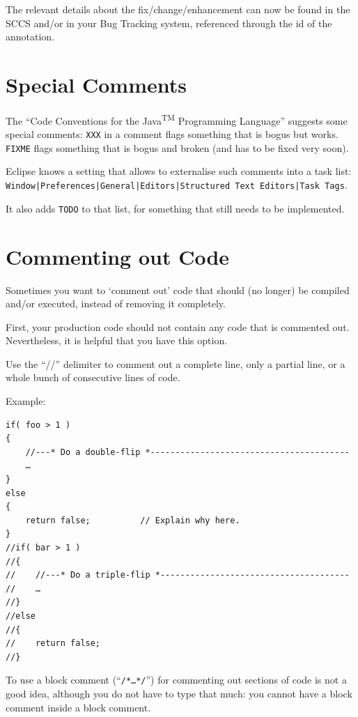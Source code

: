 \documentclass[11pt,a4paper, titlepage, parskip=half, headsepline, footsepline, cleardoublepage=current, headheight=1cm]{scrbook}
\begin{document}
The relevant details about the fix/change/enhancement can now be found in the SCCS and/or in your Bug Tracking system, referenced through the id of the annotation.


\section{Special Comments}
The “Code Conventions for the Java\textsuperscript{TM} Programming Language”\autocite{SUN_CODE_CONVENTIONS:SpecialComments} suggests some special comments: \verb#XXX# in a comment flags something that is bogus but works. \verb#FIXME# flags something that is bogus and broken (and has to be fixed very soon).

Eclipse knows a setting that allows to externalise such comments into a task list:\\ \verb#Window|Preferences|General|Editors|Structured Text Editors|Task Tags#.

It also adds \verb#TODO# to that list, for something that still needs to be implemented.


\section{Commenting out Code}
Sometimes you want to ‘comment out’ code that should (no longer) be compiled and/or executed, instead of removing it completely.

First, your production code should not contain any code that is commented out. Nevertheless, it is helpful that you have this option.

Use the “//” delimiter to comment out a complete line, only a partial line, or a whole bunch of consecutive lines of code.

Example:
\begin{lstlisting}
if( foo > 1 )
{
    //---* Do a double-flip *----------------------------------------
    …
}
else
{
    return false;          // Explain why here.
}
//if( bar > 1 )
//{
//    //---* Do a triple-flip *--------------------------------------
//    …
//}
//else
//{
//    return false;
//}
\end{lstlisting}

To use a block comment (“\verb#/*…*/#”) for commenting out sections of code is not a good idea, although you do not have to type that much: you cannot have a block comment inside a block comment.
\end{document}

